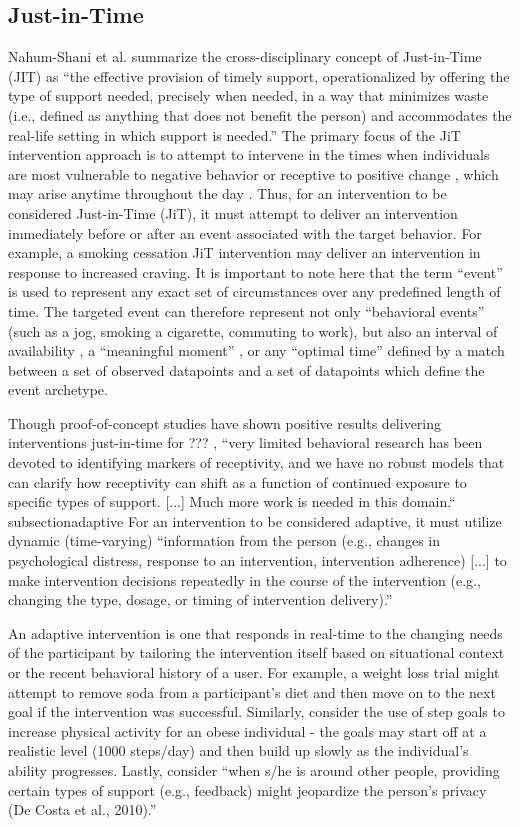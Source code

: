 \documentclass[runningheads,a4paper]{llncs}
\begin{document}
\subsection{Just-in-Time}
Nahum-Shani et al. summarize the cross-disciplinary concept of Just-in-Time (JIT) as “the effective provision of timely support, operationalized by offering the type of support needed, precisely when needed, in a way that minimizes waste (i.e., defined as anything that does not benefit the person) and accommodates the real-life setting in which support is needed.”
The primary focus of the JiT intervention approach is to attempt to intervene in the times when individuals are most vulnerable to negative behavior or receptive to positive change \cite{Ben-Zeev et al., 2014; King et al. 2013}, which may arise anytime throughout the day \cite{Fletcher, Tobias, & Wisher, 2007; Witkiewitz & Marlatt, 2004}.
Thus, for an intervention to be considered Just-in-Time (JiT), it must attempt to deliver an intervention immediately before or after an event associated with the target behavior. 
For example, a smoking cessation JiT intervention may deliver an intervention in response to increased craving.
It is important to note here that the term “event” is used to represent any exact set of circumstances over any predefined length of time.
The targeted event can therefore represent not only “behavioral events” (such as a jog, smoking a cigarette, commuting to work), but also an interval of availability \cite{???}, a “meaningful moment” \cite{???}, or any “optimal time” \cite{???} defined by a match between a set of observed datapoints and a set of datapoints which define the event archetype.

Though proof-of-concept studies have shown positive results delivering interventions just-in-time for ??? \cite{???}, “very limited behavioral research has been devoted to identifying markers of receptivity, and we have no robust models that can clarify how receptivity can shift as a function of continued exposure to specific types of support. [...] Much more work is needed in this domain.“ \cite{nahum2014}
subsection{adaptive}
For an intervention to be considered adaptive, it must utilize dynamic (time-varying) “information from the person (e.g., changes in psychological distress, response to an intervention, intervention adherence) [...] to make intervention decisions repeatedly in the course of the intervention (e.g., changing the type, dosage, or timing of intervention delivery).” \cite{nahum2014}

An adaptive intervention is one that responds in real-time to the changing needs of the participant by tailoring the intervention itself based on situational context or the recent behavioral history of a user. 
For example, a weight loss trial might attempt to remove soda from a participant’s diet and then move on to the next goal if the intervention was successful.
Similarly, consider the use of step goals to increase physical activity for an obese individual - the goals may start off at a realistic level (1000 steps/day) and then build up slowly as the individual’s ability progresses.
Lastly, consider “when s/he is around other people, providing certain types of support (e.g., feedback) might jeopardize the person’s privacy (De Costa et al., 2010).” \cite{nahum2014}
\end{document}
